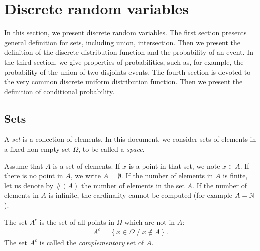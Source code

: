 %



\section{Discrete random variables}
\label{idp-section-discrandvar}

In this section, we present discrete random variables.
The first section presents general definition for sets, including
union, intersection.
Then we present the definition of the discrete distribution
function and the probability of an event.
In the third section, we give properties of probabilities, 
such as, for example, the probability of the union of two disjoints 
events.
The fourth section is devoted to the very common 
discrete uniform distribution function.
Then we present the definition of conditional probability.

\subsection{Sets}
\label{introstats-setsrandomvars}
A \emph{set} is a collection of elements. In this document, we 
consider sets of elements in a fixed non empty set $\Omega$, to be 
called a \emph{space}.

Assume that $A$ is a set of elements. If $x$ 
is a point in that set, we note $x\in A$. 
If there is no point in $A$, we write $A=\emptyset$.
If the number of elements in $A$ is finite, let us denote by $\#(A)$ the number of 
elements in the set $A$. If the number of elements in $A$ is infinite, the 
cardinality cannot be computed (for example $A=\mathbb{N}$).

The set $A^c$ is the set of all points in $\Omega$ which are not in $A$:
\begin{eqnarray}
A^c = \left\{x\in \Omega\; / \; x\notin A\right\}.
\end{eqnarray}
The set $A^c$ is called the \emph{complementary} set of $A$.

